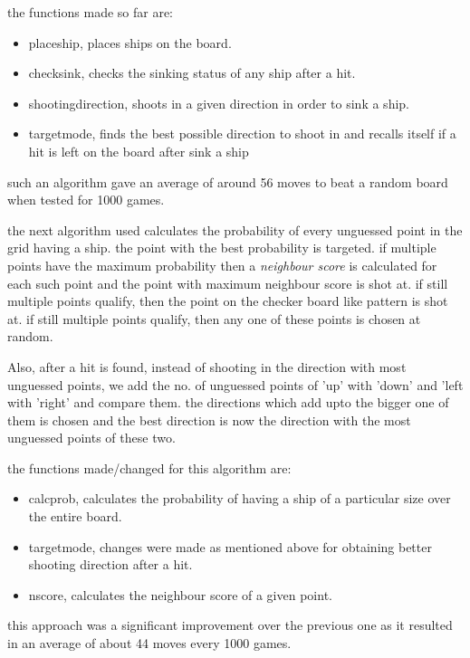 \documentclass{article}
\begin{document}
	the functions made so far are:
	\begin{itemize}
   		
   		\item placeship, places ships on the board.
   		\item checksink, checks the sinking status of any ship after a hit.
   		\item shootingdirection, shoots in a given direction in order to sink a ship.
   		\item targetmode, finds the best possible direction to shoot in and recalls itself if a hit is left on the board after sink a ship
	
	\end{itemize}
	
	such an algorithm gave an average of around 56 moves to beat a random board when tested for 1000 games.
	
	the next algorithm used calculates the probability of every unguessed point in the grid having a ship. the point with the best probability is targeted. if multiple points have the maximum probability then a \textit{neighbour score} is calculated for each such point and the point with maximum neighbour score is shot at. if still multiple points qualify, then the point on the checker board like pattern is shot at. if still multiple points qualify, then any one of these points is chosen at random.
	
	Also, after a hit is found, instead of shooting in the direction with most unguessed points, we add the no. of unguessed points of 'up' with 'down' and 'left with 'right' and compare them. the directions which add upto the bigger one of them is chosen and the best direction is now the direction with the most unguessed points of these two.
	
	the functions made/changed for this algorithm are:
	\begin{itemize}
	
		\item calcprob, calculates the probability of having a ship of a particular size over the entire board.
		\item targetmode, changes were made as mentioned above for obtaining better shooting direction after a hit.
		\item nscore, calculates the neighbour score of a given point.
	\end{itemize}
	
	this approach was a significant improvement over the previous one as it resulted in an average of about 44 moves every 1000 games.
	
\end{document}
